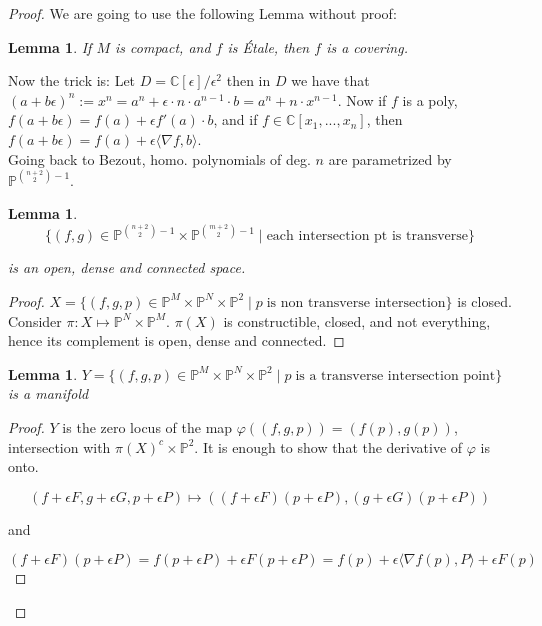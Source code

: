 \documentclass[12pt]{article}
\newtheorem{lemma}[theorem]{Lemma}
\theoremstyle{remark}
\newcommand{\C}{\mathbb{C}}
\newcommand{\Pp}{\mathbb{P}}
\begin{document}
\begin{proof}
We are going to use the following Lemma without proof:

\begin{lemma}
If $M$ is compact, and $f$ is \'{E}tale, then $f$ is a covering.
\end{lemma}

Now the trick is: Let $D =\C[\epsilon]/\epsilon^2 $ then in $D$ we have that $(a+b\epsilon)^n := x^n  = a^n + \epsilon \cdot n \cdot a^{n-1} \cdot b = a^n + n \cdot x^{n-1}$. 
Now if $f$ is a poly, $f(a+b\epsilon) = f(a) + \epsilon f'(a) \cdot b$, and if $f \in \C[x_1,...,x_n]$, 
then $f(a+b \epsilon) = f(a) + \epsilon \langle \nabla f , b \rangle$.\\

Going back to Bezout, homo. polynomials of deg. $n$ are parametrized by $\Pp^{\binom{n+2}{2}-1}$. 

\begin{lemma}
$$\{(f,g) \in \Pp^{\binom{n+2}{2}-1} \times \Pp^{\binom{m+2}{2}-1} \; | \; \text{each intersection pt is transverse} \}  $$

is an open, dense and connected space.

\end{lemma}

\begin{proof}
$X = \{ (f,g,p) \in \Pp^{M} \times \Pp^{N} \times \Pp^2 \; | \; p \; \text{is non transverse intersection} \}$ is closed. Consider $\pi: X \mapsto \Pp^N \times \Pp^M$. $\pi(X)$ is constructible, closed, and not everything, hence its complement is open, dense and connected.
\end{proof}

\begin{lemma}
$Y = \{ (f,g,p) \in \Pp^{M} \times \Pp^{N} \times \Pp^2 \; | \; p \; \text{is a transverse intersection point} \}$ is a manifold
\end{lemma}

\begin{proof}
$Y$ is the zero locus of the map $\varphi((f,g,p)) = (f(p),g(p))$, intersection with $\pi(X)^c \times \Pp^2$. It is enough to show that the derivative of $\varphi$ is onto. 

$$(f+ \epsilon F, g + \epsilon G, p+\epsilon P) \mapsto ((f+\epsilon F)(p +\epsilon P),(g+\epsilon G)(p+\epsilon P)) $$

and

$$(f+\epsilon F)(p +\epsilon P) = f(p+\epsilon P) + \epsilon F(p+\epsilon P) = f(p)+ \epsilon \langle \nabla f(p), P \rangle +\epsilon F(p)$$


\end{proof}
\end{proof}
\end{document}
